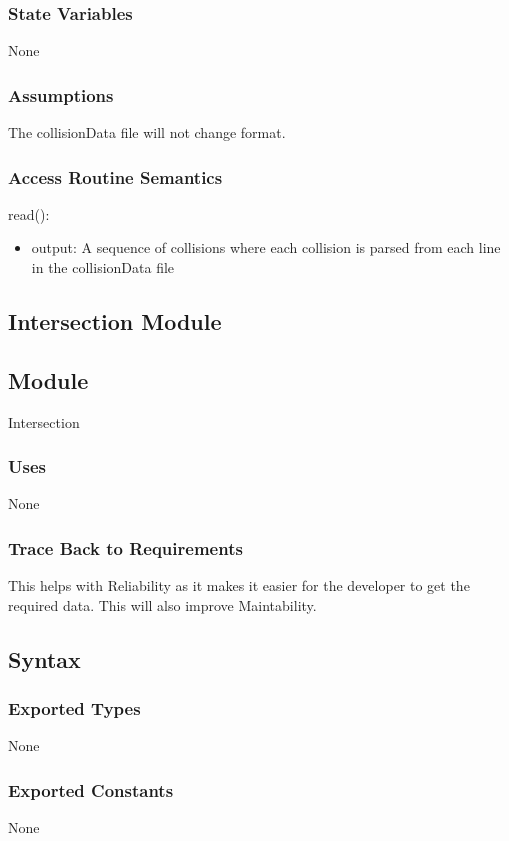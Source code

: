 \documentclass[12pt]{article}
\begin{document}
\subsubsection*{State Variables}
None

\subsubsection*{Assumptions}
The collisionData file will not change format.

\subsubsection*{Access Routine Semantics}

read():
\begin{itemize}
    \item output: A sequence of collisions where each collision is parsed from each line in the collisionData file
\end{itemize}

\newpage
\subsection{Intersection Module}
\subsection*{Module}
Intersection

\subsubsection*{Uses}
None

\subsubsection*{Trace Back to Requirements}
This helps with Reliability as it makes it easier for the developer to get the required data. This will also improve Maintability.

\subsection*{Syntax}
\subsubsection*{Exported Types}
None

\subsubsection*{Exported Constants}
None
\end{document}
